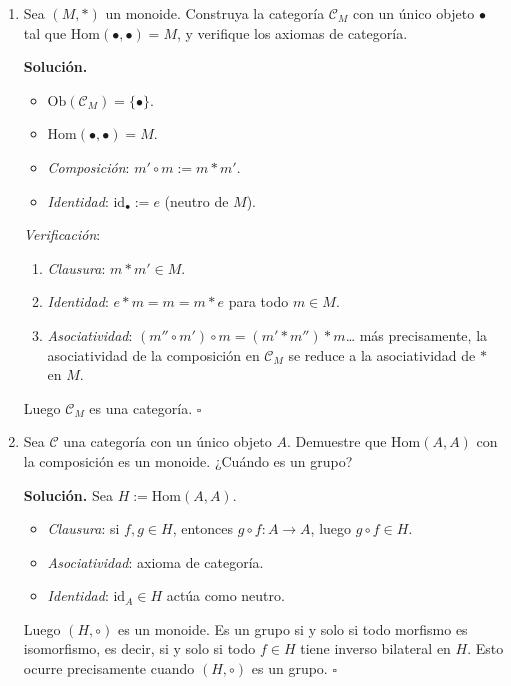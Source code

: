 \begin{enumerate}[label=\textbf{3.\arabic*.}]
\item Sea \((M,*)\) un monoide. Construya la categoría \(\mathcal{C}_M\) con un
único objeto \(\bullet\) tal que \(\mathrm{Hom}(\bullet,\bullet)=M\), y verifique
los axiomas de categoría.

\textbf{Solución.}
\begin{itemize}
    \item \(\mathrm{Ob}(\mathcal{C}_M)=\{\bullet\}\).
    \item \(\mathrm{Hom}(\bullet,\bullet)=M\).
    \item \textit{Composición}: \(m'\circ m := m*m'\).
    \item \textit{Identidad}: \(\mathrm{id}_\bullet := e\) (neutro de \(M\)).
\end{itemize}
\textit{Verificación}:
\begin{enumerate}[label=\arabic*.]
    \item \textit{Clausura}: \(m*m' \in M\).
    \item \textit{Identidad}: \(e*m=m=m*e\) para todo \(m \in M\).
    \item \textit{Asociatividad}: \((m''\circ m')\circ m = (m'*m'')*m\)\ldots
    más precisamente, la asociatividad de la composición en \(\mathcal{C}_M\)
    se reduce a la asociatividad de \(*\) en \(M\).
\end{enumerate}
Luego \(\mathcal{C}_M\) es una categoría. \hfill\(\square\)

\item Sea \(\mathcal{C}\) una categoría con un único objeto \(A\). Demuestre que
\(\mathrm{Hom}(A,A)\) con la composición es un monoide. ¿Cuándo es un grupo?

\textbf{Solución.}
Sea \(H:=\mathrm{Hom}(A,A)\).
\begin{itemize}
    \item \textit{Clausura}: si \(f,g\in H\), entonces \(g\circ f:A\to A\), luego
    \(g\circ f \in H\).
    \item \textit{Asociatividad}: axioma de categoría.
    \item \textit{Identidad}: \(\mathrm{id}_A \in H\) actúa como neutro.
\end{itemize}
Luego \((H,\circ)\) es un monoide.
Es un grupo si y solo si todo morfismo es isomorfismo, es decir, si y solo si
todo \(f \in H\) tiene inverso bilateral en \(H\). Esto ocurre precisamente cuando
\((H,\circ)\) es un grupo. \hfill\(\square\)


\end{enumerate}
